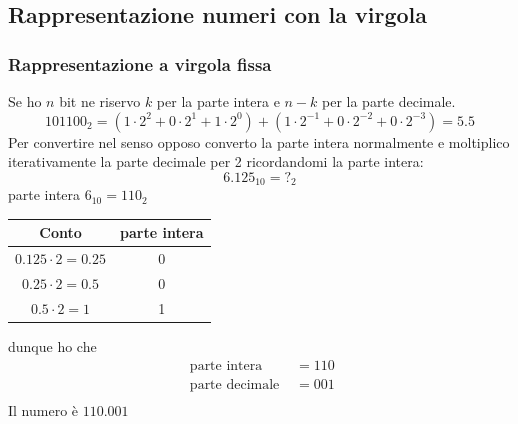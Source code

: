 \subsection{Rappresentazione numeri con la virgola}
\subsubsection*{Rappresentazione a virgola fissa}
Se ho $ n $ bit ne riservo $ k $ per la parte intera e $ n-k $ per la parte decimale.
\[
	101100_2 = \left(1 \cdot 2^{2} + 0 \cdot 2 ^{1} + 1 \cdot 2^{0}\right) + \left(1 \cdot 2^{-1} + 0 \cdot  2^{-2} + 0\cdot 2^{-3}\right) = 5.5
\]
Per convertire nel senso opposo converto la parte intera normalmente e moltiplico iterativamente la parte decimale per 2 ricordandomi la parte intera:
\[
	6.125_{10} = ?_{2}
\]
parte intera $ 6_{10} = 110_{2} $

\begin{center}
	\begin{tabular}{|c c |}
		\hline
		Conto                     & parte intera \\
		\hline
		$ 0.125 \cdot  2 = 0.25 $ & 0            \\
		$ 0.25 \cdot  2 = 0.5 $   & 0            \\
		$ 0.5 \cdot  2 = 1 $      & 1            \\
		\hline
	\end{tabular}
\end{center}

dunque ho che
\begin{align*}
	\text{ parte intera }   & = 110 \\
	\text{ parte decimale } & = 001 \\
\end{align*}
Il numero è $ 110.001 $
